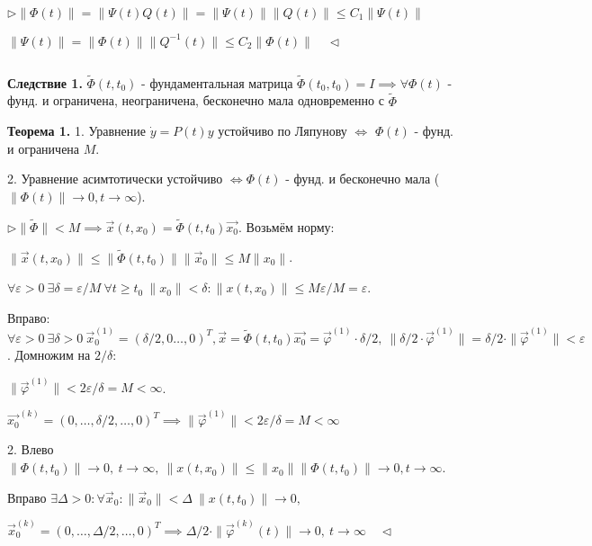 \documentclass[12pt, a4paper]{article}
\begin{document}
  $\triangleright \|\Phi(t)\| = \|\Psi(t)Q(t) \| = \| \Psi(t)\| \| Q(t) \| \le C_1 \| \Psi(t) \|$

  $\| \Psi(t) \| = \| \Phi(t)\| \| Q^{-1}(t)\| \le C_2 \| \Phi(t) \| \quad\triangleleft$

  \par $ $

  \textbf{Следствие 1.} $\widetilde\Phi(t, t_0)$ - фундаментальная матрица $\widetilde\Phi(t_0, t_0) = I \implies \forall \Phi(t)$ - 
  фунд. и ограничена, неограничена, бесконечно мала одновременно с $\widetilde{\Phi}$

  \textbf{Теорема 1.} 1. Уравнение $\dot y = P(t) y$ устойчиво по Ляпунову $\iff$ $\Phi(t)$ - фунд. и ограничена $M$.

  2. Уравнение асимтотически устойчиво $\iff \Phi(t)$ - фунд. и бесконечно мала ($\| \Phi(t)\| \to 0, t \to \infty$).

  $\triangleright \| \widetilde{\Phi} \| < M \implies \vec{x}(t, x_0) = \widetilde{\Phi}(t, t_0) \vec{x_0}.$ Возьмём норму:
  
  $\| \vec{x}(t,x_0) \| \le \| \widetilde{\Phi}(t,t_0)\| \| \vec x_0 \| \le M\|x_0\|$.

  $\forall \varepsilon > 0 \ \exists \delta = \varepsilon / M \ \forall t \ge t_0 \ \|x_0 \| < \delta : \| x(t, x_0)\| \le M \varepsilon / M = \varepsilon$.

  Вправо: $\forall \varepsilon >0 \ \exists \delta > 0 \ \vec x_0^{(1)} = (\delta/2, 0 \dotsc, 0)^T, \vec{x} = \widetilde{\Phi}(t,t_0)\vec{x_0} = \vec \varphi^{(1)} \cdot \delta / 2, \ \| \delta/2 \cdot \vec{\varphi}^{(1)}\| = \delta/2 \cdot \| \vec\varphi^{(1)}\| < \varepsilon$. Домножим на $2/\delta$:

  $\| \vec{ \varphi}^{(1)}\| < 2\varepsilon / \delta = M < \infty$.

  $\vec{x_0}^{(k)} = (0, \dotsc, \delta/2, \dotsc, 0)^T \implies \| \vec \varphi^{(1)} \| < 2\varepsilon / \delta = M < \infty$

  2. Влево $\| \Phi(t, t_0)\| \to 0, \ t\to \infty,\ \| x(t,x_0)\| \le \|x_0\| \|\Phi(t,t_0)\| \to 0, t \to \infty$.

  Вправо $\exists \Delta > 0: \forall \vec x_0 : \| \vec x_0 \| < \Delta \ \| x(t,t_0)\| \to 0,$ 
  
  $\vec x_0^{(k)} = (0, \dotsc, \Delta/2, \dotsc, 0)^T \implies \Delta/2 \cdot \| \vec\varphi^{(k)}(t)\| \to 0, \ t\to\infty \quad \triangleleft$

  \par $ $
\end{document}
